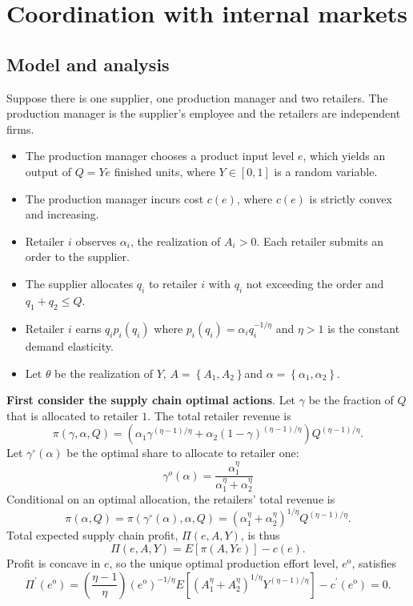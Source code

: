 \newpage
\section{Coordination with internal markets}
\subsection{Model and analysis}
Suppose there is one supplier, one production manager and two retailers. The production manager is the supplier's employee and the retailers are independent firms.

\begin{itemize}
    \item The production manager chooses a product input level $e$, which yields an output of $Q=Y e$ finished units, where $Y\in\left[0,1\right]$ is a random variable.
    \item The production manager incurs cost $c(e)$, where $c(e)$ is strictly convex and increasing.
    \item Retailer $i$ observes $\alpha_i$, the realization of $A_i>0$. Each retailer submits an order to the supplier.
    \item The supplier allocates $q_i$ to retailer $i$ with $q_i$ not exceeding the order and $q_1+q_2\leq Q$.
    \item Retailer $i$ earns $q_i p_i(q_i)$ where $p_i(q_i)=\alpha_i q_i^{-1/\eta}$ and $\eta>1$ is the constant demand elasticity. 
    \item Let $\theta$ be the realization of $Y$, $A=\left\{A_1,A_2\right\} $and $\alpha=\left\{\alpha_1,\alpha_2\right\}$.
\end{itemize}

\textbf{First consider the supply chain optimal actions}. 
Let $\gamma$ be the fraction of $Q$ that is allocated to retailer $1$. The total retailer revenue is 
\begin{equation*}
    \pi(\gamma,\alpha,Q)=\left(\alpha_1 \gamma^{(\eta-1)/\eta}+\alpha_2 (1-\gamma)^{(\eta-1)/\eta}\right)Q^{(\eta-1)/\eta}.
\end{equation*}
Let $\gamma^{\circ}(\alpha)$ be the optimal share to allocate to retailer one:
\begin{equation}
    \gamma^{o}(\alpha)=\frac{\alpha_{1}^{\eta}}{\alpha_{1}^{\eta}+\alpha_{2}^{\eta}}
\end{equation}
Conditional on an optimal allocation, the retailers' total revenue is
$$
\pi(\alpha, Q)=\pi\left(\gamma^{\circ}(\alpha), \alpha, Q\right)=\left(\alpha_{1}^{\eta}+\alpha_{2}^{\eta}\right)^{1 / \eta} Q^{(\eta-1) / \eta} .
$$
Total expected supply chain profit, $\Pi(e, A, Y)$, is thus
$$
\Pi(e, A, Y)=E[\pi(A, Y e)]-c(e) .
$$
Profit is concave in $e$, so the unique optimal production effort level, $e^{\mathrm{o}}$, satisfies
\begin{equation}
    \Pi^{\prime}\left(e^{\mathrm{o}}\right)=\left(\frac{\eta-1}{\eta}\right)\left(e^{\mathrm{o}}\right)^{-1 / \eta} E\left[\left(A_{1}^{\eta}+A_{2}^{\eta}\right)^{1 / \eta} Y^{(\eta-1) / \eta}\right]-c^{\prime}\left(e^{\mathrm{o}}\right)=0.
\end{equation}

